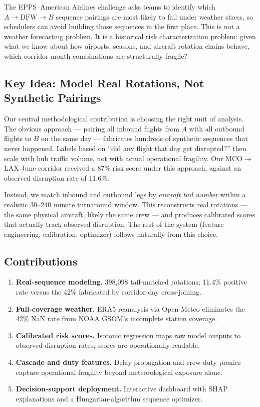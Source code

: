 \documentclass[11pt, twoside]{article}
\begin{document}
The EPPS--American Airlines challenge asks teams to identify which
$A \to \text{DFW} \to B$ sequence pairings are most likely to fail under
weather stress, so schedulers can avoid building those sequences in the first
place.  This is not a weather forecasting problem.  It is a historical risk
characterization problem: given what we know about how airports, seasons, and
aircraft rotation chains behave, which corridor-month combinations are
structurally fragile?

\subsection{Key Idea: Model Real Rotations, Not Synthetic Pairings}

Our central methodological contribution is choosing the right unit of analysis.
The obvious approach --- pairing all inbound flights from $A$ with all outbound
flights to $B$ on the same day --- fabricates hundreds of synthetic sequences
that never happened.  Labels based on ``did any flight that day get disrupted?''
then scale with hub traffic volume, not with actual operational fragility.
Our MCO$\to$LAX June corridor received a 87\% risk score under this approach,
against an observed disruption rate of 11.6\%.

Instead, we match inbound and outbound legs by \emph{aircraft tail number}
within a realistic 30--240 minute turnaround window.  This reconstructs real
rotations --- the same physical aircraft, likely the same crew --- and produces
calibrated scores that actually track observed disruption.  The rest of the
system (feature engineering, calibration, optimizer) follows naturally from
this choice.

\subsection{Contributions}
\begin{enumerate}
  \item \textbf{Real-sequence modeling.}  398,098 tail-matched rotations; 11.4\%
        positive rate versus the 42\% fabricated by corridor-day cross-joining.
  \item \textbf{Full-coverage weather.}  ERA5 reanalysis via Open-Meteo eliminates
        the 42\% NaN rate from NOAA GSOM's incomplete station coverage.
  \item \textbf{Calibrated risk scores.}  Isotonic regression maps raw model
        outputs to observed disruption rates; scores are operationally readable.
  \item \textbf{Cascade and duty features.}  Delay propagation and crew-duty
        proxies capture operational fragility beyond meteorological exposure alone.
  \item \textbf{Decision-support deployment.}  Interactive dashboard with SHAP
        explanations and a Hungarian-algorithm sequence optimizer.
\end{enumerate}
\end{document}
